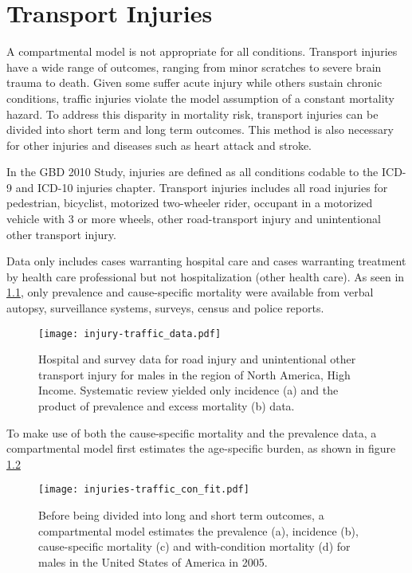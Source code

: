\chapter{Transport Injuries}
\label{applications-double_dismod}

A compartmental model is not appropriate for all conditions.  Transport injuries have a wide range of outcomes, ranging from minor scratches to severe brain trauma to death.  Given some suffer acute injury while others sustain chronic conditions, traffic injuries violate the model assumption of a constant mortality hazard.  To address this disparity in mortality risk, transport injuries can be divided into short term and long term outcomes.  This method is also necessary for other injuries and diseases such as heart attack and stroke.

In the GBD 2010 Study, injuries are defined as all conditions codable to the ICD-9 and ICD-10 injuries chapter.  Transport injuries includes all road injuries for pedestrian, bicyclist, motorized two-wheeler rider, occupant in a motorized vehicle with 3 or more wheels, other road-transport injury and unintentional other transport injury.

Data only includes cases warranting hospital care and cases warranting treatment by health care professional but not hospitalization (other health care).  As seen in \ref{fig:app-injury traffic data}, only prevalence and cause-specific mortality were available from verbal autopsy, surveillance systems, surveys, census and police reports.

    \begin{figure}[h]
        \begin{center}
            \texttt{[image: injury-traffic\_data.pdf]}
            \caption{Hospital and survey data for road injury and unintentional other transport injury for males in the region of North America, High Income.  Systematic review yielded only incidence (a) and the product of prevalence and excess mortality (b) data.}
            \label{fig:app-injury traffic data}
        \end{center}
    \end{figure}

To make use of both the cause-specific mortality and the prevalence data, a compartmental model first estimates the age-specific burden, as shown in figure \ref{fig:app-injury traffic fit}

    \begin{figure}[h]
        \begin{center}
            \texttt{[image: injuries-traffic\_con\_fit.pdf]}
            \caption{Before being divided into long and short term outcomes, a compartmental model estimates the prevalence (a), incidence (b), cause-specific mortality (c) and with-condition mortality (d) for males in the United States of America in 2005.}
            \label{fig:app-injury traffic fit}
        \end{center}
    \end{figure}


